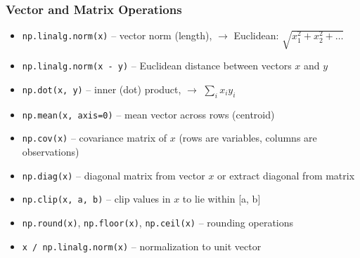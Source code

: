 \documentclass{article}
\begin{document}
\subsubsection*{Vector and Matrix Operations}
\begin{itemize}
    \item \texttt{np.linalg.norm(x)} -- vector norm (length), \texttt{$\rightarrow$} Euclidean: $\sqrt{x_1^2 + x_2^2 + \dots}$
    \item \texttt{np.linalg.norm(x - y)} -- Euclidean distance between vectors $x$ and $y$
    \item \texttt{np.dot(x, y)} -- inner (dot) product, \texttt{$\rightarrow$} $\sum_i x_i y_i$
    \item \texttt{np.mean(x, axis=0)} -- mean vector across rows (centroid)
    \item \texttt{np.cov(x)} -- covariance matrix of $x$ (rows are variables, columns are observations)
    \item \texttt{np.diag(x)} -- diagonal matrix from vector $x$ or extract diagonal from matrix
    \item \texttt{np.clip(x, a, b)} -- clip values in $x$ to lie within [a, b]
    \item \texttt{np.round(x)}, \texttt{np.floor(x)}, \texttt{np.ceil(x)} -- rounding operations
    \item \texttt{x / np.linalg.norm(x)} -- normalization to unit vector
\end{itemize}
\end{document}
